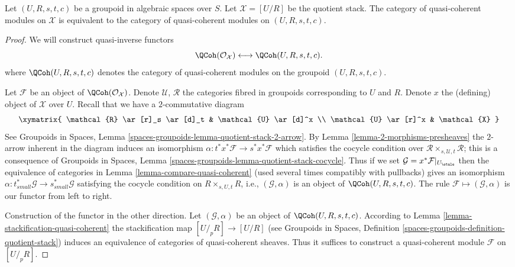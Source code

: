 \begin{proposition}
\label{proposition-quasi-coherent}
Let $(U, R, s, t, c)$ be a groupoid in algebraic spaces over $S$.
Let $\mathcal{X} = [U/R]$ be the quotient stack.
The category of quasi-coherent modules on $\mathcal{X}$
is equivalent to the category of quasi-coherent modules
on $(U, R, s, t, c)$.
\end{proposition}

\begin{proof}
We will construct quasi-inverse functors
$$
\QCoh(\mathcal{O}_\mathcal{X})
\longleftrightarrow
\QCoh(U, R, s, t, c).
$$
where $\QCoh(U, R, s, t, c)$ denotes the category of quasi-coherent modules
on the groupoid $(U, R, s, t, c)$.

\medskip\noindent
Let $\mathcal{F}$ be an object of $\QCoh(\mathcal{O}_\mathcal{X})$.
Denote $\mathcal{U}$, $\mathcal{R}$ the categories fibred in groupoids
corresponding to $U$ and $R$. Denote $x$ the (defining) object of $\mathcal{X}$
over $U$. Recall that we have a $2$-commutative diagram
$$
\xymatrix{
\mathcal{R} \ar[r]_s \ar[d]_t & \mathcal{U} \ar[d]^x \\
\mathcal{U} \ar[r]^x & \mathcal{X}
}
$$
See Groupoids in Spaces, Lemma
\ref{spaces-groupoids-lemma-quotient-stack-2-arrow}.
By Lemma \ref{lemma-2-morphisms-presheaves}
the $2$-arrow inherent in the diagram induces an isomorphism
$\alpha : t^*x^*\mathcal{F} \to s^*x^*\mathcal{F}$
which satisfies the cocycle condition over
$\mathcal{R} \times_{s, \mathcal{U}, t} \mathcal{R}$;
this is a consequence of Groupoids in Spaces, Lemma
\ref{spaces-groupoids-lemma-quotient-stack-cocycle}.
Thus if we set $\mathcal{G} = x^*\mathcal{F}|_{U_\etale}$
then the equivalence of categories in
Lemma \ref{lemma-compare-quasi-coherent}
(used several times compatibly with pullbacks)
gives an isomorphism
$\alpha : t_{small}^*\mathcal{G} \to s_{small}^*\mathcal{G}$
satisfying the cocycle condition on $R \times_{s, U, t} R$, i.e.,
$(\mathcal{G}, \alpha)$ is an object of $\QCoh(U, R, s, t, c)$.
The rule $\mathcal{F} \mapsto (\mathcal{G}, \alpha)$ is our
functor from left to right.

\medskip\noindent
Construction of the functor in the other direction.
Let $(\mathcal{G}, \alpha)$ be an object of $\QCoh(U, R, s, t, c)$.
According to Lemma \ref{lemma-stackification-quasi-coherent}
the stackification map $[U/_{\!p}R] \to [U/R]$ (see
Groupoids in Spaces, Definition
\ref{spaces-groupoids-definition-quotient-stack})
induces an equivalence of categories of quasi-coherent sheaves.
Thus it suffices to construct a quasi-coherent module $\mathcal{F}$
on $[U/_{\!p}R]$.


\end{proof}
